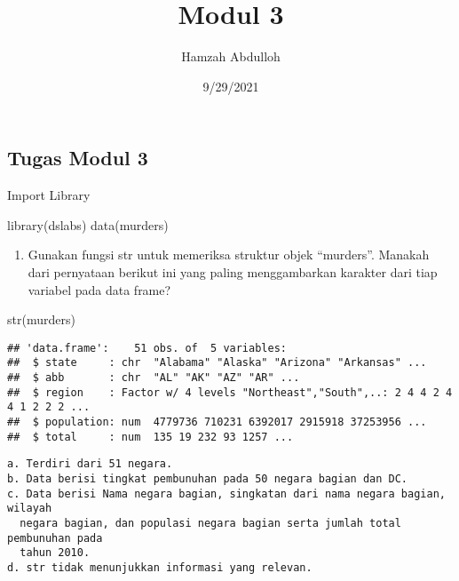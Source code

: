 \documentclass[
]{article}
\title{Modul 3}
\author{Hamzah Abdulloh}
\date{9/29/2021}
\newenvironment{Shaded}{\begin{snugshade}}{\end{snugshade}}
\newcommand{\FunctionTok}[1]{\textcolor[rgb]{0.00,0.00,0.00}{#1}}
\newcommand{\NormalTok}[1]{#1}
\providecommand{\tightlist}{%
  \setlength{\itemsep}{0pt}\setlength{\parskip}{0pt}}
\begin{document}
\maketitle

\hypertarget{tugas-modul-3}{%
\subsection{Tugas Modul 3}\label{tugas-modul-3}}

Import Library

\begin{Shaded}
\begin{Highlighting}[]
\FunctionTok{library}\NormalTok{(dslabs)}
\FunctionTok{data}\NormalTok{(murders) }
\end{Highlighting}
\end{Shaded}

\begin{enumerate}
\def\labelenumi{\arabic{enumi}.}
\tightlist
\item
  Gunakan fungsi str untuk memeriksa struktur objek ``murders''. Manakah
  dari pernyataan berikut ini yang paling menggambarkan karakter dari
  tiap variabel pada data frame?
\end{enumerate}

\begin{Shaded}
\begin{Highlighting}[]
\FunctionTok{str}\NormalTok{(murders)}
\end{Highlighting}
\end{Shaded}

\begin{verbatim}
## 'data.frame':    51 obs. of  5 variables:
##  $ state     : chr  "Alabama" "Alaska" "Arizona" "Arkansas" ...
##  $ abb       : chr  "AL" "AK" "AZ" "AR" ...
##  $ region    : Factor w/ 4 levels "Northeast","South",..: 2 4 4 2 4 4 1 2 2 2 ...
##  $ population: num  4779736 710231 6392017 2915918 37253956 ...
##  $ total     : num  135 19 232 93 1257 ...
\end{verbatim}

\begin{verbatim}
a. Terdiri dari 51 negara.
b. Data berisi tingkat pembunuhan pada 50 negara bagian dan DC.
c. Data berisi Nama negara bagian, singkatan dari nama negara bagian, wilayah
  negara bagian, dan populasi negara bagian serta jumlah total pembunuhan pada
  tahun 2010.
d. str tidak menunjukkan informasi yang relevan.
\end{verbatim}
\end{document}
